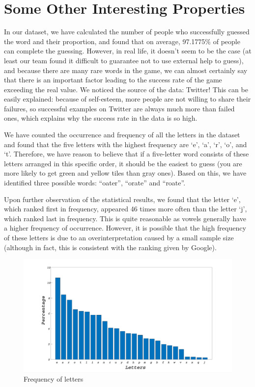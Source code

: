 \documentclass[12pt]{article}  %
\begin{document}
\section{Some Other Interesting Properties}
In our dataset, we have calculated the number of people who successfully guessed the word and their proportion, and found that on average, 97.1775\% of people can complete the guessing. However, in real life, it doesn't seem to be the case (at least our team found it difficult to guarantee not to use external help to guess), and because there are many rare words in the game, we can almost certainly say that there is an important factor leading to the success rate of the game exceeding the real value. We noticed the source of the data: Twitter! This can be easily explained: because of self-esteem, more people are not willing to share their failures, so successful examples on Twitter are always much more than failed ones, which explains why the success rate in the data is so high.

We have counted the occurrence and frequency of all the letters in the dataset and found that the five letters with the highest frequency are `e', `a', `r', `o', and `t'. Therefore, we have reason to believe that if a five-letter word consists of these letters arranged in this specific order, it should be the easiest to guess (you are more likely to get green and yellow tiles than gray ones). Based on this, we have identified three possible words: ``oater'', ``orate'' and ``roate''.

Upon further observation of the statistical results, we found that the letter `e', which ranked first in frequency, appeared 46 times more often than the letter `j', which ranked last in frequency. This is quite reasonable as vowels generally have a higher frequency of occurrence. However, it is possible that the high frequency of these letters is due to an overinterpretation caused by a small sample size (although in fact, this is consistent with the ranking given by Google).
\begin{figure}[htbp]
\centering
\includegraphics[width=\textwidth]{img/zimu.pdf}
\caption{Frequency of letters}
\end{figure}
\end{document}
